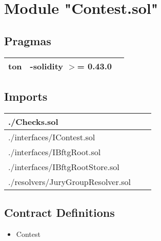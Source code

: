 
\section{Module "Contest.sol"}


\subsection{Pragmas}


\noindent\begin{tabular}{|l|l|p{5cm}|}\hline
ton & -solidity $>$= 0.43.0 &\\\hline
\end{tabular}


\subsection{Imports}


\noindent\begin{tabular}{|l|l|p{5cm}|}\hline
./Checks.sol &\\\hline
./interfaces/IContest.sol &\\\hline
./interfaces/IBftgRoot.sol &\\\hline
./interfaces/IBftgRootStore.sol &\\\hline
./resolvers/JuryGroupResolver.sol &\\\hline
\end{tabular}


\subsection{Contract Definitions}

\begin{itemize}
\item Contest
\end{itemize}
